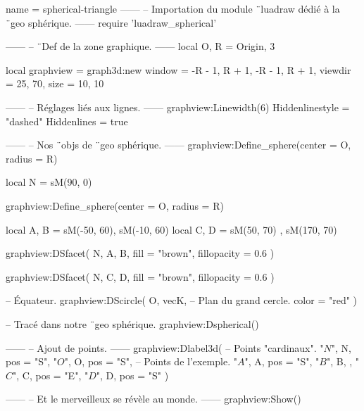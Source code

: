 \documentclass{standalone}
\begin{document}
\begin{luadraw}{name = spherical-triangle}
------
-- Importation du module ¨luadraw dédié à la ¨geo sphérique.
------
require 'luadraw_spherical'

------
-- ¨Def de la zone graphique.
------
local O, R = Origin, 3

local graphview = graph3d:new{
  window  = {-R - 1, R + 1, -R - 1, R + 1},
  viewdir = {25, 70},
  size    = {10, 10}
}

------
-- Réglages liés aux lignes.
------
graphview:Linewidth(6)
Hiddenlinestyle = "dashed"
Hiddenlines     = true

------
-- Nos ¨objs de ¨geo sphérique.
------
graphview:Define_sphere({center = O, radius = R})

local N = sM(90, 0)

graphview:Define_sphere({center = O, radius = R})

local A, B = sM(-50, 60), sM(-10, 60)
local C, D = sM(50, 70) , sM(170, 70)

graphview:DSfacet(
  {N, A, B},
  {fill = "brown", fillopacity = 0.6}
)

graphview:DSfacet(
  {N, C, D},
  {fill = "brown", fillopacity = 0.6}
)

-- Équateur.
graphview:DScircle(
  {O, vecK},       -- Plan du grand cercle.
  {color = "red"}
)

-- Tracé dans notre ¨geo sphérique.
graphview:Dspherical()

------
-- Ajout de points.
------
graphview:Dlabel3d(
-- Points "cardinaux".
  "$N$", N, {pos = "S"},
  "$O$", O, {pos = "S"},
-- Points de l'exemple.
  "$A$", A, {pos = "S"},
  "$B$", B, {},
  "$C$", C, {pos = "E"},
  "$D$", D, {pos = "S"}
)

------
-- Et le merveilleux se révèle au monde.
------
graphview:Show()
\end{luadraw}
\end{document}
